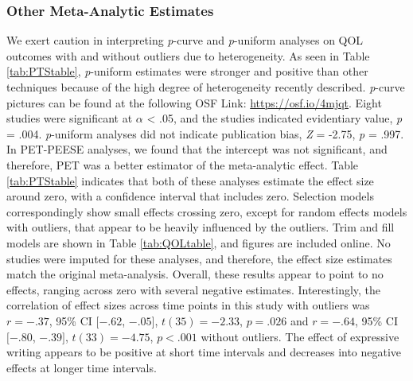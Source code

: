 \documentclass[english,man]{apa6}
\theoremstyle{definition}
\theoremstyle{definition}
\theoremstyle{definition}
\theoremstyle{remark}
\begin{document}
\subsubsection{Other Meta-Analytic
Estimates}\label{other-meta-analytic-estimates-2}

We exert caution in interpreting \emph{p}-curve and \emph{p}-uniform
analyses on QOL outcomes with and without outliers due to heterogeneity.
As seen in Table \ref{tab:PTStable}, \emph{p}-uniform estimates were
stronger and positive than other techniques because of the high degree
of heterogeneity recently described. \emph{p}-curve pictures can be
found at the following OSF Link: \url{https://osf.io/4mjqt}. Eight
studies were significant at \(\alpha\) \textless{} .05, and the studies
indicated evidentiary value, \emph{p} = .004. \emph{p}-uniform analyses
did not indicate publication bias, \emph{Z} = -2.75, \emph{p} = .997. In
PET-PEESE analyses, we found that the intercept was not significant, and
therefore, PET was a better estimator of the meta-analytic effect. Table
\ref{tab:PTStable} indicates that both of these analyses estimate the
effect size around zero, with a confidence interval that includes zero.
Selection models correspondingly show small effects crossing zero,
except for random effects models with outliers, that appear to be
heavily influenced by the outliers. Trim and fill models are shown in
Table \ref{tab:QOLtable}, and figures are included online. No studies
were imputed for these analyses, and therefore, the effect size
estimates match the original meta-analysis. Overall, these results
appear to point to no effects, ranging across zero with several negative
estimates. Interestingly, the correlation of effect sizes across time
points in this study with outliers was \(r = -.37\), 95\% CI \([-.62\),
\(-.05]\), \(t(35) = -2.33\), \(p = .026\) and \(r = -.64\), 95\% CI
\([-.80\), \(-.39]\), \(t(33) = -4.75\), \(p < .001\) without outliers.
The effect of expressive writing appears to be positive at short time
intervals and decreases into negative effects at longer time intervals.
\end{document}
